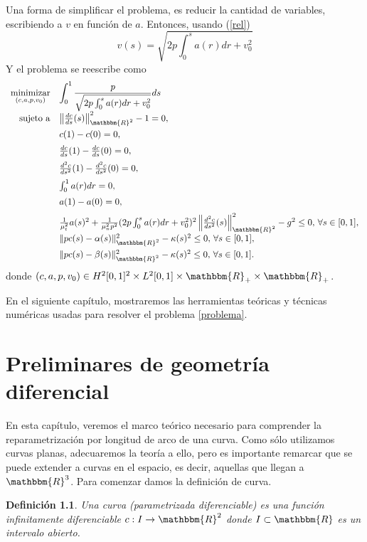 \documentclass[a4paper,10pt]{book}
\newcommand{\R}{\mathbbm{R}}
\newcommand{\arr}{\rightarrow}
\newtheorem{defi}[teo]{Definici\'on}
\begin{document}
Una forma de simplificar el problema, es reducir la cantidad de variables, escribiendo a $v$ en función de $a$. Entonces, usando (\ref{rel}) 
\begin{equation}\label{vel}
v(s)=\sqrt{2p \int_0^s a(r)dr + v_0^2}
\end{equation}
Y el problema se reescribe como
\begin{equation}\label{problema}
\begin{array}{rl}
\displaystyle \mathop{\mathrm{minimizar}}_{(c,a,p,v_0)} & \displaystyle \int_{0}^{1} \frac{p}{\sqrt{2p \int_0^s a(r)dr + v_0^2}}ds \\
 \mathrm{sujeto \ a} & \left\|\frac{dc}{ds}(s)\right\|_{\R^2}^2-1=0,\\[2mm]
                     & c(1)-c(0)=0,\\[2mm]
                     & \frac{dc}{ds}(1)-\frac{dc}{ds}(0)=0,\\[2mm]
                     & \frac{d^2c}{ds^2}(1)-\frac{d^2c}{ds^2}(0)=0,\\[2mm]
                     & \int_{0}^{1} a(r)dr=0,\\[2mm]
                     & a(1)-a(0)=0,\\[2mm]
                     & \frac{1}{\mu_t^2} a(s)^2 + \frac{1}{\mu_n^2 p^2}(2p \int_0^s a(r)dr + v_0^2)^2\left\| \frac{d^2 c}{ds^2}(s) \right\|_{\R^2}^2-g^2\leq 0,\,\forall s\in[0,1],\\[2mm]
                     &  \|pc(s)-\alpha(s)\|_{\R^2}^2-\kappa(s)^2 \leq 0,\,\forall s\in[0,1], \\[2mm]
                     &  \|pc(s)-\beta(s)\|_{\R^2}^2-\kappa(s)^2 \leq 0, \,\forall s\in[0,1].

  \end{array}
\end{equation}
donde $(c,a,p,v_0)\in H^2[0,1]^2 \times L^2[0,1]\times \R_+\times \R_+$. 

En el siguiente capítulo, mostraremos las herramientas teóricas y técnicas numéricas usadas para resolver el problema \eqref{problema}.

\chapter{Preliminares de geometría diferencial}\label{reparametr}

En esta capítulo, veremos el marco teórico necesario para comprender la reparametrización por longitud de arco de una curva. Como sólo utilizamos curvas planas, adecuaremos la teoría a ello, pero es importante remarcar que se puede extender a curvas en el espacio, es decir, aquellas que llegan a $\R^3$. Para comenzar damos la definición de curva.
\begin{defi}
 Una curva (parametrizada diferenciable) es una función infinitamente diferenciable $c:I\arr\R^2$ donde $I\subset\R$ es un intervalo abierto.
\end{defi}
\end{document}
